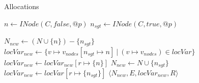 \begin{algorithm}
\caption{Allocations}\label{algo:pt:alloc}
\begin{algorithmic}[1]
    \State $n       \gets INode(C, false, @p)$
    \State $n_{sgt} \gets INode(C, true, @p)$

        \State $N_{new} \gets (N \cup \{ n \}) - \{ n_{sgt} \}$
        \State $locVar_{new} \gets \{ v \mapsto v_{nodes}[n_{sgt} \mapsto n] ~|~ (v \mapsto v_{nodes}) \in locVar \}$
        \State $locVar_{new} \gets locVar_{new}[ r \mapsto \{n\}]$
    \Else
        \State $N_{new} \gets N \cup \{ n_{sgt} \}$
        \State $locVar_{new} \gets locVar[ r \mapsto \{n_{sgt}\}]$
    \EndIf
    \State \Return $\langle N_{new}, E, locVar_{new}, R \rangle$
\EndFunction
\end{algorithmic}
\end{algorithm}


